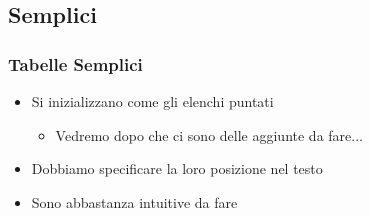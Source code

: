 \subsection{Semplici}
\begin{frame}

  \frametitle{Tabelle Semplici}
  
  \begin{itemize}
   \item Si inizializzano come gli elenchi puntati
   \begin{itemize}
    \item Vedremo dopo che ci sono delle aggiunte da fare...
   \end{itemize}
   \item Dobbiamo specificare la loro posizione nel testo
   \item Sono abbastanza intuitive da fare
  \end{itemize}

\end{frame}
